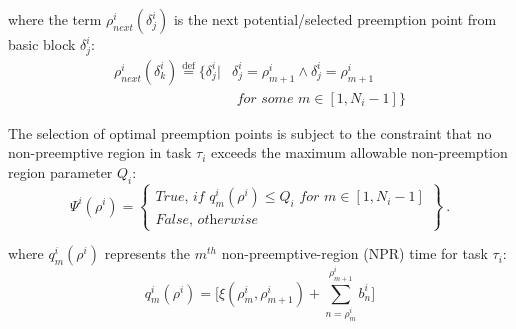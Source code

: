 \noindent
where the term \begin{math}\rho_{next}^{i}(\delta_{j}^{i})\end{math} is the next potential/selected preemption point from basic block \begin{math}\delta_{j}^{i}\end{math}:
\begin{equation}\label{eqn:ppnext-set}
\begin{split}
   \rho_{next}^{i}(\delta_{k}^{i}) \stackrel{\text{def}}{=} \{\delta_{j}^{i}|&\delta_{j}^{i} = \rho_{m+1}^{i} \wedge \delta_{j}^{i} = \rho_{m+1}^{i} \\ &\textit{ for some m} \in [1,N_{i}-1]\}
\end{split}
\end{equation}

\noindent
The selection of optimal preemption points is subject to the constraint that no non-preemptive region in task \begin{math}\tau_{i}\end{math} exceeds the maximum allowable non-preemption region parameter \begin{math}Q_{i}\end{math}:
\begin{equation}\label{eqn:pp-constraint}
   \Psi^{i}(\rho^{i}) =
\left\{
\begin{array}{l}
    \textit{True, if } q_{m}^{i}(\rho^{i}) \leq Q_{i} \textit{ for } m \in [1,N_{i}-1] \\
    \textit{False, otherwise}
\end{array}
\right\}~.
\end{equation}

\noindent
where \begin{math}q_{m}^{i}(\rho^{i})\end{math} represents the \begin{math}m^{th}\end{math} non-preemptive-region (NPR) time for task \begin{math}\tau_{i}\end{math}:
\begin{equation}\label{eqn:mthnpr-time}
   q_{m}^{i}(\rho^{i}) = \Big[\xi(\rho_{m}^{i},\rho_{m+1}^{i}) + \sum_{n=\rho_{m}^{i}}^{\rho_{m+1}^{i}}b_{n}^{i}\Big]
\end{equation}

